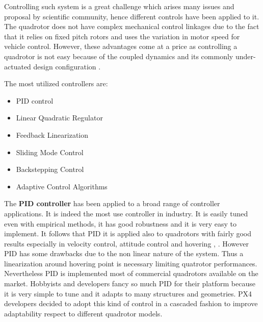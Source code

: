 Controlling such system is a great challenge which arises many issues and proposal by scientific community, hence different controls have been applied to it. The quadrotor does not have complex mechanical control linkages due to the fact that it relies on fixed pitch rotors and uses the variation in motor speed for vehicle control. However, these advantages come at a price as controlling a quadrotor is not easy because of the coupled dynamics and its commonly under-actuated design configuration \cite{Algorithms2014}.
\par The most utilized controllers are: \begin{itemize}
\item PID control
\item Linear Quadratic Regulator
\item Feedback Linearization
\item Sliding Mode Control
\item Backstepping Control
\item Adaptive Control Algorithms
\end{itemize}
The \textbf{PID controller} has been applied to a broad range of controller applications. It is indeed the most use controller in industry. It is easily tuned even with empirical methods, it has good robustness and it is very easy to implement. It follows that PID it is applied also to quadrotors with fairly good results  especially in velocity control, attitude control and hovering \cite{Mahony2012}, \cite{Erginer2007}. However PID has some drawbacks due to the non linear nature of the system. Thus a linearization around hovering point is necessary \cite{Bouabdallah2} limiting quatrotor performances. Nevertheless PID is implemented most of commercial quadrotors available on the market. Hobbyists and developers fancy so much PID for their platform because it is very simple to tune and it adapts to many structures and geometries. PX4 developers decided to adopt this kind of control in a cascaded fashion to improve adaptability respect to different quadrotor models. \par
\noindent
